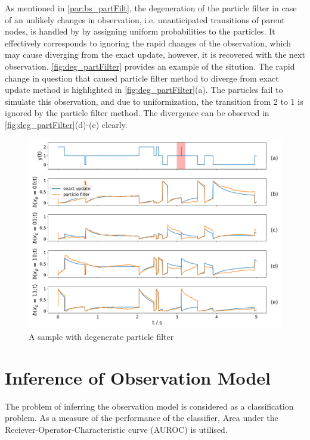 As mentioned in \cref{par:bs_partFilt}, the degeneration of the particle filter in case of an unlikely changes in observation, i.e. unanticipated transitions of parent nodes, is handled by by assigning uniform probabilities to the particles. It effectively corresponds to ignoring the rapid changes of the observation, which may cause diverging from the exact update, however, it is recovered with the next observation. \autoref{fig:deg_partFilter} provides an example of the sitution. The rapid change in question that caused particle filter method to diverge from exact update method is highlighted in \autoref{fig:deg_partFilter}(a). The particles fail to simulate this observation, and due to uniformization, the transition from 2 to 1 is ignored by the particle filter method. The divergence can be observed in \autoref{fig:deg_partFilter}(d)-(e) clearly.
\begin{figure}[H]
	\begin{center}
		\includegraphics[width=.90\textwidth]{figures/degenerate_pf/belief_traj}
		\caption{A sample with degenerate particle filter}
		\label{fig:deg_partFilter}
	\end{center}
\end{figure}

\section{Inference of Observation Model}
The problem of inferring the observation model is considered as a classification problem. As a measure of the performance of the classifier, Area under the Reciever-Operator-Characteristic curve (AUROC) is utilised. 
